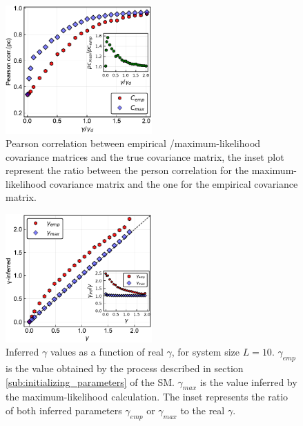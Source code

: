 \documentclass[preprint,amsmath,amssymb,superscriptaddress,showpacs,pre]{revtex4-1}
\providecommand{\DIFaddbeginFL}{} %
\providecommand{\DIFaddendFL}{} %
\providecommand{\DIFdelbeginFL}{} %
\providecommand{\DIFdelendFL}{} %
\newcommand{\DIFscaledelfig}{0.5}
\newlength{\DIFdelgraphicswidth} %
\newlength{\DIFdelgraphicsheight} %
\newcommand{\DIFaddincludegraphics}[2][]{{\color{blue}\fbox{\DIFOincludegraphics[#1]{#2}}}} %
\newcommand{\DIFdelincludegraphics}[2][]{%
\sbox{\DIFdelgraphicsbox}{\DIFOincludegraphics[#1]{#2}}%
\settoboxwidth{\DIFdelgraphicswidth}{\DIFdelgraphicsbox} %
\settoboxtotalheight{\DIFdelgraphicsheight}{\DIFdelgraphicsbox} %
\scalebox{\DIFscaledelfig}{%
\parbox[b]{\DIFdelgraphicswidth}{\usebox{\DIFdelgraphicsbox}\\[-\baselineskip] \rule{\DIFdelgraphicswidth}{0em}}\llap{\resizebox{\DIFdelgraphicswidth}{\DIFdelgraphicsheight}{%
\setlength{\unitlength}{\DIFdelgraphicswidth}%
\begin{picture}(1,1)%
\thicklines\linethickness{2pt} %
{\color[rgb]{1,0,0}\put(0,0){\framebox(1,1){}}}%
{\color[rgb]{1,0,0}\put(0,0){\line( 1,1){1}}}%
{\color[rgb]{1,0,0}\put(0,1){\line(1,-1){1}}}%
\end{picture}%
}\hspace*{3pt}}} %
} %
\DeclareRobustCommand{\DIFaddbeginFL}{\DIFOaddbeginFL \let\includegraphics\DIFaddincludegraphics} %
\DeclareRobustCommand{\DIFaddendFL}{\DIFOaddendFL \let\includegraphics\DIFOincludegraphics} %
\DeclareRobustCommand{\DIFdelbeginFL}{\DIFOdelbeginFL \let\includegraphics\DIFdelincludegraphics} %
\DeclareRobustCommand{\DIFdelendFL}{\DIFOaddendFL \let\includegraphics\DIFOincludegraphics} %
\begin{document}
\begin{figure}[!htb]
	\centering
	\DIFdelbeginFL %
\DIFdelendFL \DIFaddbeginFL \includegraphics[keepaspectratio=true,width=0.5\textwidth]{Figures/corr_C_L10_balanced_tree_100_rep.pdf}
	\DIFaddendFL \caption{ Pearson correlation between empirical /maximum-likelihood   covariance matrices and the true covariance matrix, the inset plot represent the ratio between the person correlation for the  maximum-likelihood covariance matrix and the one for the empirical covariance matrix.}
	\label{fig:pears_L10}
\end{figure}


\begin{figure}[!htb]
	\centering
	\DIFdelbeginFL %
\DIFdelendFL \DIFaddbeginFL \includegraphics[keepaspectratio=true,width=0.5\textwidth]{Figures/scatter_gamma_L10_100.pdf}
	\DIFaddendFL \caption{Inferred $\gamma$ values as a function of real $\gamma$, for system size $L=10$. $\gamma_{emp}$ is the value obtained by the process described in section \ref{sub:initializing_parameters} of the SM. $\gamma_{max}$ is the value inferred by the maximum-likelihood calculation. 
	The inset represents the ratio of both inferred parameters $\gamma_{emp}$ or $\gamma_{max}$ to the real $\gamma$. }
	\label{fig:scatter_gamma_L10}
\end{figure}
\end{document}
